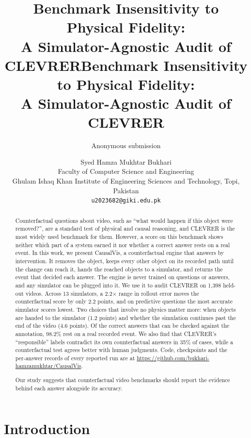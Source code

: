 \IfFileExists{TMLR}{\documentclass[10pt]{article}}%
\title{Benchmark Insensitivity to Physical Fidelity:\\A Simulator-Agnostic Audit of CLEVRER}
\title{Benchmark Insensitivity to Physical Fidelity:\\A Simulator-Agnostic Audit of CLEVRER}
\author{Anonymous submission}
\author{Syed Hamza Mukhtar Bukhari\\
  Faculty of Computer Science and Engineering\\
  Ghulam Ishaq Khan Institute of Engineering Sciences and Technology, Topi, Pakistan\\
  {\tt\small u2023682@giki.edu.pk}}
\date{}
\newif\ifanon
\newcommand{\sys}{CausalVis}
\begin{document}
\maketitle

\begin{abstract}
Counterfactual questions about video, such as ``what would happen if this object were removed?'', are a standard test of physical and causal reasoning, and CLEVRER is the most widely used benchmark for them.
However, a score on this benchmark shows neither which part of a system earned it nor whether a correct answer rests on a real event.
In this work, we present \sys{}, a counterfactual engine that answers by intervention.
It removes the object, keeps every other object on its recorded path until the change can reach it, hands the reached objects to a simulator, and returns the event that decided each answer.
The engine is never trained on questions or answers, and any simulator can be plugged into it.
We use it to audit CLEVRER on 1,398 held-out videos.
Across 13 simulators, a 2.2$\times$ range in rollout error moves the counterfactual score by only 2.2 points, and on predictive questions the most accurate simulator scores lowest.
Two choices that involve no physics matter more: when objects are handed to the simulator (1.2 points) and whether the simulation continues past the end of the video (4.6 points).
Of the correct answers that can be checked against the annotation, 98.2\% rest on a real recorded event.
We also find that CLEVRER's ``responsible'' labels contradict its own counterfactual answers in 35\% of cases, while a counterfactual test agrees better with human judgments.
\ifanon Code, checkpoints and the per-answer records of every reported run will be released.

\else Code, checkpoints and the per-answer records of every reported run are at {\small \url{https://github.com/bukhari-hamzamukhtar/CausalVis}}.

\fi
Our study suggests that counterfactual video benchmarks should report the evidence behind each answer alongside its accuracy.
\end{abstract}

\section{Introduction}
\label{sec:intro}
\end{document}
